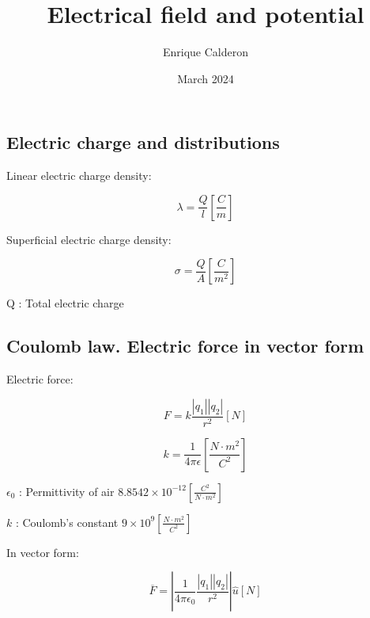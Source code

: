 \documentclass[letterpaper]{article}
\title{Electrical field and potential}
\author{Enrique Calderon}
\date{March 2024}
\newcommand{\divline}{\noindent\makebox[\linewidth]{\rule{\textwidth}{0.4pt}}}
\begin{document}
    \maketitle

    \divline
    \begin{multicols}{2}
        \section{Electric charge and distributions}
        
        Linear electric charge density:
        
        \[\lambda = \frac{Q}{l} \left[\frac{C}{m}\right]\]

        Superficial electric charge density:

        \[\sigma = \frac{Q}{A} \left[\frac{C}{m^{2}}\right]\]

        Q : Total electric charge
    \end{multicols}

    \divline
    \begin{multicols}{2}
        \section{Coulomb law. Electric force in vector form}
        
        Electric force:

        \[F = k \frac{|q_{1}||q_{2}|}{r^{2}}[N]\]

        \[k = \frac{1}{4 \pi \epsilon} \left[\frac{N \cdot m^{2}}{C^{2}}\right] \]

        \(\epsilon_{0}\) : Permittivity of air \( 8.8542 \times 10^{-12} \left[\frac{C^{2}}{N \cdot m^{2}}\right] \)

        \(k\) : Coulomb's constant \(9 \times 10^{9} \left[\frac{N \cdot m^{2}}{C^{2}}\right] \)

        In vector form:

         \[\overline{F} = \left| \frac{1}{4 \pi \epsilon_{0}} \frac{|q_{1}||q_{2}|}{r^{2}} \right| \hat{u}  [N]\]
        
    \end{multicols}
\end{document}
